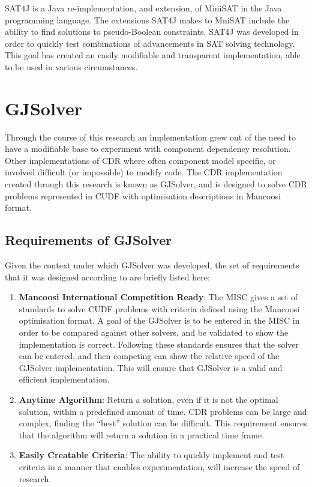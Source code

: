 SAT4J \citep{le2010sat4j} is a Java re-implementation, and extension, of MiniSAT in the Java programming language.
The extensions SAT4J makes to MniSAT include the ability to find solutions to pseudo-Boolean constraints.
SAT4J was developed in order to quickly test combinations of advancements in SAT solving technology.
This goal has created an easily modifiable and transparent implementation, able to be used in various circumstances.

\section{GJSolver}
Through the course of this research an implementation grew out of the need to have a modifiable base to experiment with component dependency resolution.
Other implementations of CDR where often component model specific, or involved difficult (or impossible) to modify code.
The CDR implementation created through this research is known as GJSolver, 
and is designed to solve CDR problems represented in CUDF with optimisation descriptions in Mancoosi format.

\subsection{Requirements of GJSolver}

Given the context under which GJSolver was developed, the set of requirements that it was designed according to are briefly listed here:
\begin{enumerate}
  \item \textbf{Mancoosi International Competition Ready}: The MISC gives a set of standards to solve CUDF problems with criteria defined using the Mancoosi optimisation format.
  A goal of the GJSolver is to be entered in the MISC in order to be compared against other solvers, and be validated to show the implementation is correct.
  Following these standards ensures that the solver can be entered, and then competing can show the relative speed of the GJSolver implementation.
  This will ensure that GJSolver is a valid and efficient implementation. 
  \item \textbf{Anytime Algorithm}: Return a solution, even if it is not the optimal solution, within a predefined amount of time. 
  CDR problems can be large and complex, finding the ``best'' solution can be difficult. 
  This requirement ensures that the algorithm will return a solution in a practical time frame.
  \item \textbf{Easily Creatable Criteria}: The ability to quickly implement and test criteria in a manner that enables experimentation, will increase the speed of research.
\end{enumerate}

